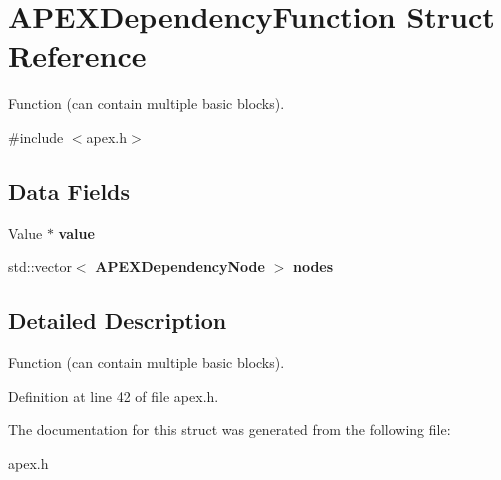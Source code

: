 \section{A\+P\+E\+X\+Dependency\+Function Struct Reference}
\label{structAPEXDependencyFunction}


Function (can contain multiple basic blocks).  




{\ttfamily \#include $<$apex.\+h$>$}

\subsection*{Data Fields}
\begin{DoxyCompactItemize}
\item 
\mbox{\label{structAPEXDependencyFunction_ad40a9b218b3412fbef6d251c096348da}} 
Value $\ast$ {\bfseries value}
\item 
\mbox{\label{structAPEXDependencyFunction_a88b9c8546d91814c01326726b91b882a}} 
std\+::vector$<$ \textbf{ A\+P\+E\+X\+Dependency\+Node} $>$ {\bfseries nodes}
\end{DoxyCompactItemize}


\subsection{Detailed Description}
Function (can contain multiple basic blocks). 

Definition at line 42 of file apex.\+h.



The documentation for this struct was generated from the following file\+:\begin{DoxyCompactItemize}
\item 
apex.\+h\end{DoxyCompactItemize}
